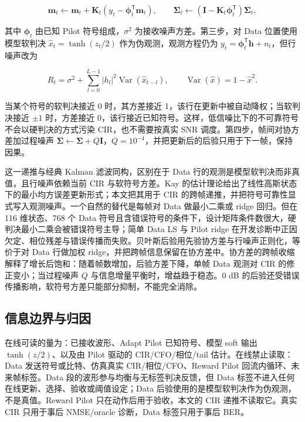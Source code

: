 \begin{equation*}
\mathbf{m}_t\leftarrow\mathbf{m}_t+\mathbf{K}_t\left(y_t-\boldsymbol{\phi}_t^{\mathsf T}\mathbf{m}_t\right),\qquad
\boldsymbol{\Sigma}_t\leftarrow\left(\mathbf{I}-\mathbf{K}_t\boldsymbol{\phi}_t^{\mathsf T}\right)\boldsymbol{\Sigma}_t,
\end{equation*}

其中 $\boldsymbol{\phi}_t$ 由已知 Pilot 符号组成，$\sigma^2$ 为接收噪声方差。第三步，对 Data 位置使用模型软判决 $\hat{x}_t=\tanh(z_t/2)$ 作为伪观测，观测方程仍为 $y_t=\boldsymbol{\phi}_t^{\mathsf T}\mathbf{h}+n_t$，但行噪声改为

\begin{equation*}
R_t=\sigma^2+\sum_{l=0}^{L-1}|h_l|^2\operatorname{Var}(\hat{x}_{t-l}),\qquad
\operatorname{Var}(\hat{x})=1-\hat{x}^2.
\end{equation*}

当某个符号的软判决接近 0 时，其方差接近 1，该行在更新中被自动降权；当软判决接近 $\pm1$ 时，方差接近 0，该行接近已知符号。这样，低信噪比下的不可靠符号不会以硬判决的方式污染 CIR，也不需要按真实 SNR 调度。第四步，帧间对协方差加过程噪声 $\boldsymbol{\Sigma}\leftarrow\boldsymbol{\Sigma}+Q\mathbf{I}$，$Q=10^{-4}$，并把更新后的后验只用于下一帧，保持因果。

这一递推与经典 Kalman 滤波同构，区别在于 Data 行的观测是模型软判决而非真值，且行噪声依赖当前 CIR 与软符号方差。Kay 的估计理论给出了线性高斯状态下的最小均方误差更新形式\cite{kay1993}；本文把其用于 CIR 的跨帧递推，并把符号可靠性显式写入观测噪声。一个自然的替代是每帧对 Data 做最小二乘或 ridge 回归。但在 116 维状态、768 个 Data 符号且含错误符号的条件下，设计矩阵条件数很大，硬判决最小二乘会被错误符号主导；简单 Data LS 与 Pilot ridge 在开发诊断中正因欠定、相位残差与错误传播而失败。贝叶斯后验用先验协方差与行噪声正则化，等价于对 Data 行做加权 ridge，并把跨帧信息保留在协方差中。协方差的跨帧收缩解释了增长后饱和：随着帧数增加，后验方差下降，单帧 Data 观测对 CIR 的修正变小；当过程噪声 $Q$ 与信息增量平衡时，增益趋于稳态。0 dB 的后验还受错误传播影响，软符号方差只能部分抑制，不能完全消除。

\subsection{信息边界与归因}

在线可读的量为：已接收波形、Adapt Pilot 已知符号、模型 soft 输出 $\tanh(z/2)$、以及由 Pilot 驱动的 CIR/CFO/相位/tail 估计。在线禁止读取：Data 发送符号或比特、仿真真实 CIR/相位/CFO、Reward Pilot 回流内循环、未来帧标签。Data 段的波形参与均衡与无标签判决反馈，但 Data 标签不进入任何在线更新、选择、验收或阈值设定；Data 后验使用的是模型软判决作为伪观测，不是真值。Reward Pilot 只在动作后用于验收，本文的 CIR 递推不读取它。真实 CIR 只用于事后 NMSE/oracle 诊断，Data 标签只用于事后 BER。

